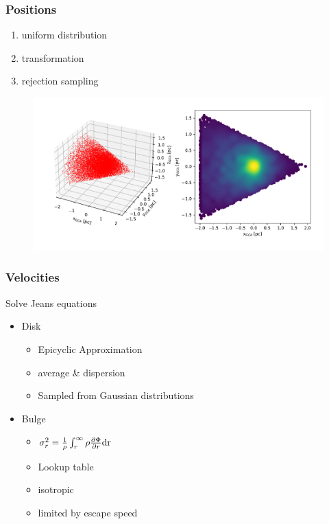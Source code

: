 \documentclass{beamer}
\begin{document}
\begin{frame}
\frametitle{Positions}

\begin{enumerate}
\item uniform distribution
\item transformation
\item rejection sampling
\end{enumerate}

\begin{figure}
\centering
\includegraphics[width=\linewidth]{Images/cone_3D.pdf}
\end{figure}

\end{frame}


\begin{frame}
\frametitle{Velocities}

Solve Jeans equations

\begin{itemize}
\item Disk
	\begin{itemize}
	\item Epicyclic Approximation
	\item average \& dispersion
	\item Sampled from Gaussian distributions
	\end{itemize}
\item Bulge
	\begin{itemize}
	\item \(\sigma_r^2 = \frac{1}{\rho}\int_{r}^{\infty}\rho \frac{\partial \Phi}{\partial r}\textup{dr}\)
	\item Lookup table
	\item isotropic
	\item limited by escape speed
	\end{itemize}
\end{itemize}

\end{frame}
\end{document}
